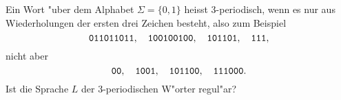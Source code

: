 Ein Wort "uber dem Alphabet $\Sigma=\{0,1\}$ heisst
3-periodisch, wenn es nur aus Wiederholungen der ersten drei Zeichen besteht,
also zum Beispiel
\[
\text{\tt 011011011},\quad
\text{\tt 100100100},\quad
\text{\tt 101101},\quad
\text{\tt 111},
\]
nicht aber
\[
\text{\tt 00},\quad
\text{\tt 1001},\quad
\text{\tt 101100},\quad
\text{\tt 111000}.
\]
Ist die Sprache $L$ der 3-periodischen W"orter regul"ar?


